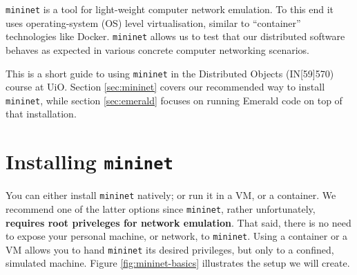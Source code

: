 \documentclass{article}
\newcommand{\mininet}{\texttt{mininet}}
\begin{document}
\maketitle

\mininet{} is a tool for light-weight computer network emulation. To
this end it uses operating-system (OS) level virtualisation, similar
to ``container'' technologies like Docker. \mininet{} allows us to
test that our distributed software behaves as expected in various
concrete computer networking scenarios.

This is a short guide to using \mininet{} in the Distributed Objects
(IN[59]570) course at UiO. Section \ref{sec:mininet} covers our
recommended way to install \mininet{}, while section \ref{sec:emerald}
focuses on running Emerald code on top of that installation.

\section{Installing \mininet{}}

You can either install \mininet{} natively; or run it in a VM, or a
container. We recommend one of the latter options since \mininet{},
rather unfortunately, \textbf{requires root priveleges for network
emulation}. That said, there is no need to expose your personal
machine, or network, to \mininet{}. Using a container or a VM allows
you to hand \mininet{} its desired privileges, but only to a confined,
simulated machine. Figure \ref{fig:mininet-basics} illustrates the
setup we will create.
\end{document}
